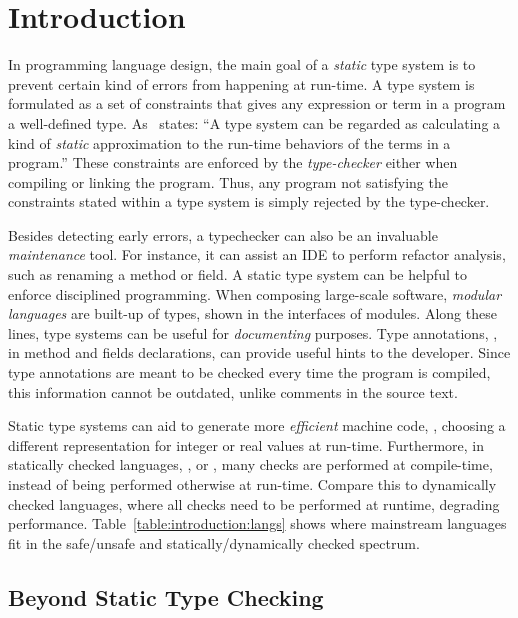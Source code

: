 \chapter{Introduction}

In programming language design, the main goal of a \emph{static} type system is to prevent certain kind of errors from happening at run-time.
A type system is formulated as a set of constraints that gives any expression or term in a program a well-defined type.
As~\cite{pierceTypesProgrammingLanguages2002} states:
``A type system can be regarded as calculating a kind of \emph{static} approximation to the run-time behaviors of the terms in a program.''
These constraints are enforced by the \emph{type-checker} either when compiling or linking the program.
Thus, any program not satisfying the constraints stated within a type system is simply rejected by the type-checker.

Besides detecting early errors,
a typechecker can also be an invaluable \emph{maintenance} tool.
For instance, it can assist an IDE to perform refactor analysis,
such as renaming a method or field.
A static type system can be helpful to enforce disciplined programming.
When composing large-scale software,
\emph{modular languages} are built-up of types,
shown in the interfaces of modules.
Along these lines,
type systems can be useful for \emph{documenting} purposes.
Type annotations, \eg{}, in method and fields declarations,
can provide useful hints to the developer.
Since type annotations are meant to be checked every time the program is compiled,
this information cannot be outdated, unlike comments in the source text.

Static type systems can aid to generate more \emph{efficient} machine code, \eg{},
choosing a different representation for integer or real values at run-time.
Furthermore, in statically checked languages, \eg{}, \java{} or \rust{},
many checks are performed at compile-time,
instead of being performed otherwise at run-time.
Compare this to dynamically checked languages,
where all checks need to be performed at runtime,
degrading performance.
Table~\ref{table:introduction:langs} shows where mainstream languages fit in the safe/unsafe and statically/dynamically checked spectrum.



\section{Beyond Static Type Checking}

